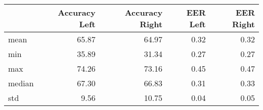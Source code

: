 \begin{tabular}{lrrrr}
\toprule
{} &  Accuracy Left &  Accuracy Right &  EER Left &  EER Right \\
\midrule
mean   &          65.87 &           64.97 &      0.32 &       0.32 \\
min    &          35.89 &           31.34 &      0.27 &       0.27 \\
max    &          74.26 &           73.16 &      0.45 &       0.47 \\
median &          67.30 &           66.83 &      0.31 &       0.33 \\
std    &           9.56 &           10.75 &      0.04 &       0.05 \\
\bottomrule
\end{tabular}
